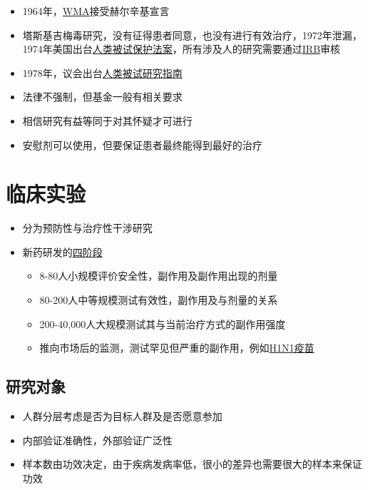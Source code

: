 \documentclass[]{book}
\providecommand{\tightlist}{%
  \setlength{\itemsep}{0pt}\setlength{\parskip}{0pt}}
\begin{document}
\begin{itemize}
\tightlist
\item
  1964年，\href{http://www.wma.net/en/60about/70history/01declarationHelsinki/index.html}{WMA}接受赫尔辛基宣言
\item
  塔斯基吉梅毒研究，没有征得患者同意，也没有进行有效治疗，1972年泄漏，1974年美国出台\href{http://www.hhs.gov/ohrp/humansubjects/guidance/45cfr46.html}{人类被试保护法案}，所有涉及人的研究需要通过\href{http://www.hhs.gov/ohrp/humansubjects/guidance/45cfr46.html\#46.107}{IRB}审核
\item
  1978年，议会出台\href{http://www.hhs.gov/ohrp/policy/belmont.html}{人类被试研究指南}
\item
  法律不强制，但基金一般有相关要求
\item
  相信研究有益等同于对其怀疑才可进行
\item
  安慰剂可以使用，但要保证患者最终能得到最好的治疗
\end{itemize}

\section{临床实验}

\begin{itemize}
\tightlist
\item
  分为预防性与治疗性干涉研究
\item
  新药研发的\href{https://clinicaltrials.gov/ct2/info/glossary\#phasel}{四阶段}

  \begin{itemize}
  \tightlist
  \item
    8-80人小规模评价安全性，副作用及副作用出现的剂量
  \item
    80-200人中等规模测试有效性，副作用及与剂量的关系
  \item
    200-40,000人大规模测试其与当前治疗方式的副作用强度
  \item
    推向市场后的监测，测试罕见但严重的副作用，例如\href{http://sphweb.bumc.bu.edu/otlt/MPH-Modules/EP/EP713_ClinicalTrials/H1N1_Surveillance.pdf}{H1N1疫苗}
  \end{itemize}
\end{itemize}

\subsection{研究对象}

\begin{itemize}
\tightlist
\item
  人群分层考虑是否为目标人群及是否愿意参加
\item
  内部验证准确性，外部验证广泛性
\item
  样本数由功效决定，由于疾病发病率低，很小的差异也需要很大的样本来保证功效
\end{itemize}
\end{document}
